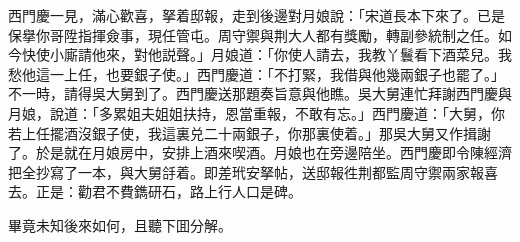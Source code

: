 西門慶一見，滿心歡喜，拏着邸報，走到後邊對月娘說：「宋道長本下來了。已是保擧你哥陞指揮僉事，現任管屯。周守禦與荆大人都有獎勵，轉副參統制之任。如今快使小廝請他來，對他説聲。」月娘道：「你使人請去，我教丫鬟看下酒菜兒。我愁他這一上任，也要銀子使。」西門慶道：「不打緊，我借與他幾兩銀子也罷了。」不一時，請得吳大舅到了。西門慶送那題奏旨意與他瞧。吳大舅連忙拜謝西門慶與月娘，說道：「多累姐夫姐姐扶持，恩當重報，不敢有忘。」西門慶道：「大舅，你若上任擺酒沒銀子使，我這裏兑二十兩銀子，你那裏使着。」那吳大舅又作揖謝了。於是就在月娘房中，安排上酒來喫酒。月娘也在旁邊陪坐。西門慶即令陳經濟把全抄寫了一本，與大舅㧱着。即差玳安拏帖，送邸報徃荆都監周守禦兩家報喜去。正是：勸君不費鐫研石，路上行人口是碑。

畢竟未知後來如何，且聽下囬分解。

